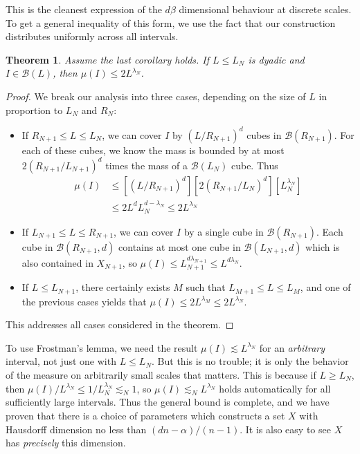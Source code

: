 \documentclass{article}
\theoremstyle{plain}
\theoremstyle{plain}
\newtheorem{theorem}{Theorem}
\begin{document}
\begin{multicols}{2}
This is the cleanest expression of the $d \beta$ dimensional behaviour at discrete scales. To get a general inequality of this form, we use the fact that our construction distributes uniformly across all intervals.

\begin{theorem}
	Assume the last corollary holds. If $L \leq L_N$ is dyadic and $I \in \mathcal{B}(L)$, then $\mu(I) \leq 2 L^{\lambda_N}$.
\end{theorem}
\begin{proof}
	We break our analysis into three cases, depending on the size of $L$ in proportion to $L_N$ and $R_N$:
	\begin{itemize}
		\item If $R_{N+1} \leq L \leq L_N$, we can cover $I$ by $(L/R_{N+1})^d$ cubes in $\mathcal{B}(R_{N+1})$. For each of these cubes, we know the mass is bounded by at most $2(R_{N+1}/L_{N+1})^d$ times the mass of a $\mathcal{B}(L_N)$ cube. Thus
		\begin{align*}
			\mu(I) &\leq [(L/R_{N+1})^d] [2(R_{N+1}/L_N)^d] [L_N^{\lambda_N}]\\
			&\leq 2 L^d L_N^{d - \lambda_N} \leq 2 L^{\lambda_N}
		\end{align*}

		\item If $L_{N+1} \leq L \leq R_{N+1}$, we can cover $I$ by a single cube in $\mathcal{B}(R_{N+1})$. Each cube in $\mathcal{B}(R_{N+1},d)$ contains at most one cube in $\mathcal{B}(L_{N+1},d)$ which is also contained in $X_{N+1}$, so $\mu(I) \leq L_{N+1}^{d\lambda_{N+1}} \leq L^{d \lambda_N}$.

		\item If $L \leq L_{N+1}$, there certainly exists $M$ such that $L_{M+1} \leq L \leq L_M$, and one of the previous cases yields that $\mu(I) \leq 2 L^{\lambda_M} \leq 2 L^{\lambda_N}$.
	\end{itemize}
	This addresses all cases considered in the theorem.
\end{proof}

To use Frostman's lemma, we need the result $\mu(I) \lesssim L^{\lambda_N}$ for an {\it arbitrary} interval, not just one with $L \leq L_N$. But this is no trouble; it is only the behavior of the measure on arbitrarily small scales that matters. This is because if $L \geq L_N$, then $\mu(I)/L^{\lambda_N} \leq 1/L_N^{\lambda_N} \lesssim_N 1$, so $\mu(I) \lesssim_N L^{\lambda_N}$ holds automatically for all sufficiently large intervals. Thus the general bound is complete, and we have proven that there is a choice of parameters which constructs a set $X$ with Hausdorff dimension no less than $(dn - \alpha)/(n-1)$. It is also easy to see $X$ has {\it precisely} this dimension.


\end{multicols}
\end{document}
